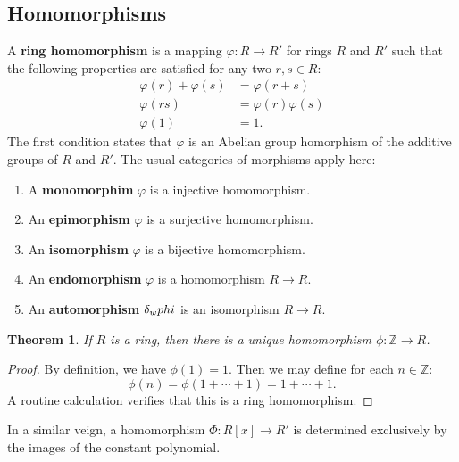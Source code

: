 \documentclass[11pt]{article}
\newtheorem{theorem}{Theorem}
\begin{document}

\subsection{Homomorphisms}


A \textbf{ring homomorphism} is a mapping $\varphi : R \to R'$ for rings $R$ and $R'$ such that the following properties are satisfied for any two $r, s \in R$:
\begin{align*}
	\varphi(r) + \varphi(s) &= \varphi(r + s) \\
	\varphi(rs) &= \varphi(r) \varphi(s) \\
	\varphi(1) &= 1.
\end{align*}
The first condition states that $\varphi$ is an Abelian group homorphism of the additive groups of $R$ and $R'$. The usual categories of morphisms apply here:

\newpage

\begin{enumerate}
	\item A \textbf{monomorphim} $\varphi$ is a injective homomorphism.
	\item An \textbf{epimorphism} $\varphi$ is a surjective homomorphism.
	\item An \textbf{isomorphism} $\varphi$ is a bijective homomorphism.
	\item An \textbf{endomorphism} $\varphi$ is a homomorphism $R \to R$.
	\item An \textbf{automorphism} $\var_{w}
		phi$ is an isomorphism $R \to R$.
\end{enumerate}

\begin{theorem}
	If $R$ is a ring, then there is a unique homomorphism $\phi : \mathbb{Z} \to R$.
\end{theorem}
\begin{adjustwidth}{0.5cm}{}
	\begin{proof}
		By definition, we have $\phi(1) = 1$. Then we may define for each $n \in \mathbb{Z}$:
		\[
			\phi(n) = \phi(1 + \cdots + 1) = 1 + \cdots + 1.
		\]
		A routine calculation verifies that this is a ring homomorphism.
	\end{proof}
\end{adjustwidth}

In a similar veign, a homomorphism $\Phi : R[x] \to R'$ is determined exclusively by the images of the constant polynomial.
\end{document}
